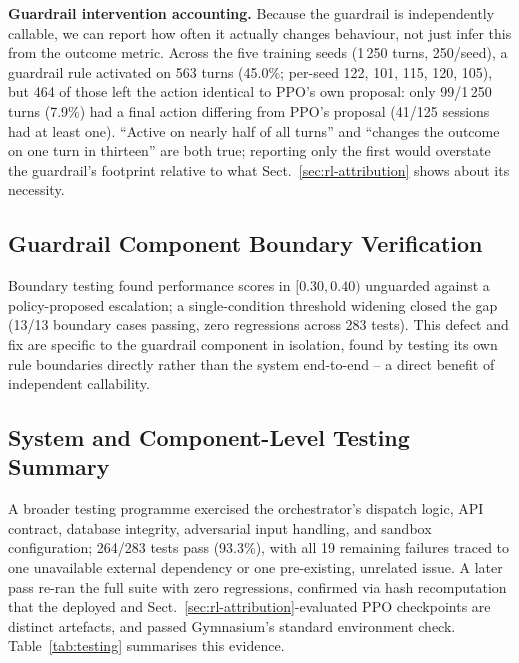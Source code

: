 \documentclass[runningheads]{llncs}
\begin{document}
\textbf{Guardrail intervention accounting.} Because the guardrail is independently callable, we can report how often it actually changes behaviour, not just infer this from the outcome metric. Across the five training seeds (1\,250 turns, 250/seed), a guardrail rule activated on 563 turns (45.0\%; per-seed 122, 101, 115, 120, 105), but 464 of those left the action identical to PPO's own proposal: only 99/1\,250 turns (7.9\%) had a final action differing from PPO's proposal (41/125 sessions had at least one). ``Active on nearly half of all turns'' and ``changes the outcome on one turn in thirteen'' are both true; reporting only the first would overstate the guardrail's footprint relative to what Sect.~\ref{sec:rl-attribution} shows about its necessity.

\subsection{Guardrail Component Boundary Verification}

Boundary testing found performance scores in $[0.30, 0.40)$ unguarded against a policy-proposed escalation; a single-condition threshold widening closed the gap (13/13 boundary cases passing, zero regressions across 283 tests). This defect and fix are specific to the guardrail component in isolation, found by testing its own rule boundaries directly rather than the system end-to-end -- a direct benefit of independent callability.

\subsection{System and Component-Level Testing Summary}

A broader testing programme exercised the orchestrator's dispatch logic, API contract, database integrity, adversarial input handling, and sandbox configuration; 264/283 tests pass (93.3\%), with all 19 remaining failures traced to one unavailable external dependency or one pre-existing, unrelated issue. A later pass re-ran the full suite with zero regressions, confirmed via hash recomputation that the deployed and Sect.~\ref{sec:rl-attribution}-evaluated PPO checkpoints are distinct artefacts, and passed Gymnasium's standard environment check. Table~\ref{tab:testing} summarises this evidence.
\end{document}
